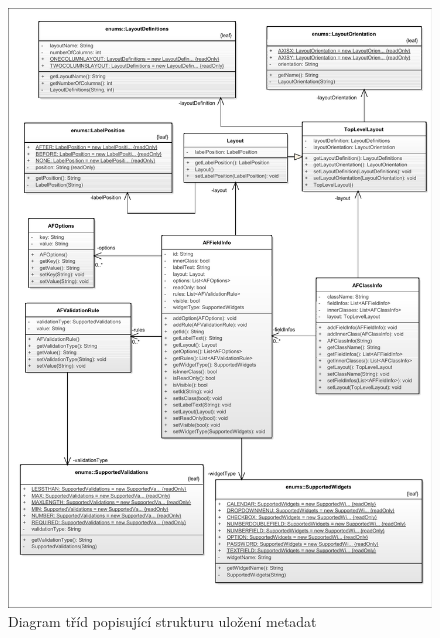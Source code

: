\begin{figure}
\begin{center}
\includegraphics[width=\textwidth, height=\textheight, keepaspectratio, trim=4 4 4 4, clip]{figures/metadataClass}
\caption{Diagram tříd popisující strukturu uložení metadat}
\label{img:metadataClass}
\end{center}
\end{figure}

